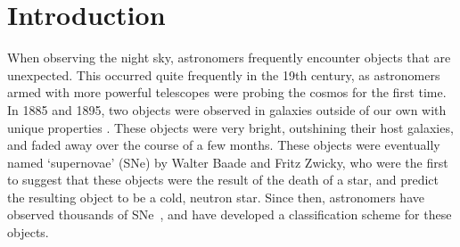 \chapter{Introduction}
\label{chap:introduction}

% 


When observing the night sky, astronomers frequently encounter objects that 
are unexpected. This occurred quite frequently in the 19th century, as astronomers 
armed with more powerful telescopes were probing the cosmos for the first time. 
In 1885 and 1895, two objects were observed in galaxies outside of our own with unique 
properties \parencite{deVaucouleurs1985, Schaefer1995}. These objects were very 
bright, outshining their host galaxies, and faded away over the course of a few months.
These objects were eventually named `supernovae' (SNe) by Walter Baade and Fritz Zwicky, who were the first to suggest that
these objects were the result of the death of a star, and predict the resulting 
object to be a cold, neutron star\parencite{Baade1934}. Since then, astronomers 
have observed thousands of SNe~\parencite{Barbon1999}, and have
developed a classification scheme for these objects.  

